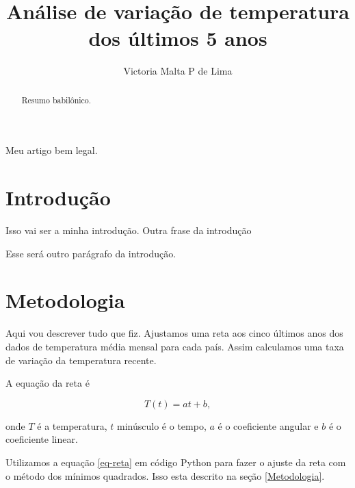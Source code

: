 \documentclass{article}
\begin{document}

\title{Análise de variação de temperatura dos últimos 5 anos}

\author{Victoria Malta P de Lima}

\maketitle

Meu artigo bem legal.

\begin{abstract}
Resumo babilônico.

\end{abstract}

\section{Introdução}

Isso vai ser a minha introdução.
Outra frase da introdução

Esse será outro parágrafo da introdução.

\section{Metodologia}

Aqui vou descrever tudo que fiz.
Ajustamos uma reta aos cinco últimos anos dos dados de temperatura média
mensal para cada país.
Assim calculamos uma taxa de variação da temperatura recente.

A equação da reta é

\begin{equation} 
T(t) = a t + b,
\label{eq-reta}
\end{equation}

\noindent %
onde $T$ é a temperatura, $t$ minúsculo é o tempo, $a$ é o coeficiente angular e $b$ é o coeficiente linear.

Utilizamos a equação \ref{eq-reta} em código Python para fazer o ajuste da 
reta com o método dos mínimos quadrados.
Isso esta descrito na seção \ref{Metodologia}.

\end{document}
